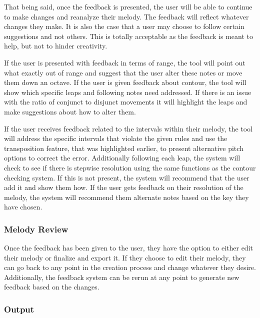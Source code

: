 \vspace{\baselineskip}

That being said, once the feedback is presented, the user will be able to continue to make changes and reanalyze their melody.  The feedback will reflect whatever changes they make.  It is also the case that a user may choose to follow certain suggestions and not others.  This is totally acceptable as the feedback is meant to help, but not to hinder creativity.

\vspace{\baselineskip}

If the user is presented with feedback in terms of range, the tool will point out what exactly out of range and suggest that the user alter these notes or move them down an octave.  If the user is given feedback about contour, the tool will show which specific leaps and following notes need addressed.  If there is an issue with the ratio of conjunct to disjunct movements it will highlight the leaps and make suggestions about how to alter them.

\vspace{\baselineskip}

If the user receives feedback related to the intervals within their melody, the tool will address the specific intervals that violate the given rules and use the transposition feature, that was highlighted earlier, to present alternative pitch options to correct the error.  Additionally following each leap, the system will check to see if there is stepwise resolution using the same functions as the contour checking system.  If this is not present, the system will recommend that the user add it and show them how.  If the user gets feedback on their resolution of the melody, the system will recommend them alternate notes based on the key they have chosen.

\subsubsection{Melody Review}
\label{subsubsec:melodyreview}

Once the feedback has been given to the user, they have the option to either edit their melody or finalize and export it.  If they choose to edit their melody, they can go back to any point in the creation process and change whatever they desire.  Additionally, the feedback system can be rerun at any point to generate new feedback based on the changes.

\subsubsection{Output}
\label{subsubsec:output}


